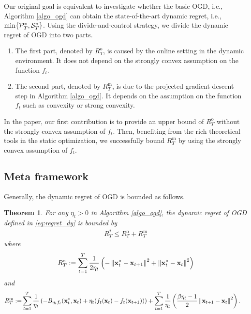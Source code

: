 \documentclass{article}
\newtheorem{Theorem}{\bf{Theorem}}
\begin{document}
Our original goal is equivalent to investigate whether the basic OGD, i.e., Algorithm \ref{algo_ogd} can obtain the state-of-the-art dynamic regret, i.e., $\min\{{\mathcal{P}}_T^{\ast}, {\mathcal{S}}_T^{\ast}\}$.  Using the divide-and-control strategy, we divide the dynamic regret of OGD into two parts. 
\begin{enumerate}
\item The first part, denoted by $R^{\mathrm{o}}_T$, is caused by the online setting in the dynamic environment. It does not depend on the strongly convex assumption on the function $f_t$. 
\item The second part, denoted by $R^{\mathrm{m}}_T$, is due to the projected gradient descent step in Algorithm \ref{algo_ogd}. It depends on the assumption on the function $f_t$ such as convexity or strong convexity. 
\end{enumerate}

In the paper, our first contribution is to provide an upper bound of $R^{\mathrm{o}}_T$ without the strongly convex assumption of $f_t$. Then, benefiting from the rich theoretical tools in the static optimization, we successfully bound $R^{\mathrm{m}}_T $ by using the strongly convex assumption of $f_t$. 


\subsection{Meta framework}
Generally, the dynamic regret of OGD is bounded as follows. 

\begin{Theorem}
\label{theorem_high_level_regret}
For any $\eta_t >0$ in Algorithm \ref{algo_ogd}, the dynamic regret of OGD defined in \eqref{eq:regret_dy} is bounded by 
\begin{align}
\nonumber
R_T^{\ast} \le R^{\mathrm{o}}_T + R^{\mathrm{m}}_T
\end{align}  where \begin{align}
\nonumber
R^{\mathrm{o}}_T := \sum\limits_{t=1}^{T} \frac{1}{2\eta_t} \left(   -  \left\lVert{\bf x}_t^{\ast} - {\bf x}_{t+1}\right\rVert^2   + \left\lVert {\bf x}_t^{\ast} - {\bf x}_t \right\rVert^2  \right)
\end{align} and 
\begin{align}
\nonumber
R^{\mathrm{m}}_T := & \sum\limits_{t=1}^{T} \frac{1}{\eta_t} \left(  -B_{\eta_t f_t}({\bf x}_t^{\ast}, {\bf x}_t) + \eta_t (f_t({\bf x}_t) - f_t({\bf x}_{t+1})) \right)  + \sum\limits_{t=1}^{T} \frac{1}{\eta_t} \left( \frac{\beta \eta_t - 1}{2}\left\lVert{\bf x}_{t+1} - {\bf x}_t\right\rVert^2 \right).
\end{align}
\end{Theorem} 
\end{document}
